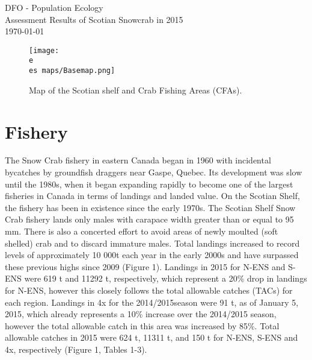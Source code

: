 \documentclass[paper=a4, fontsize=11pt]{article}
\newcommand{\e}{\string~/ecomod_data/}
\newcommand{\es}{snowcrab/}
\begin{document}
  \begin{titlepage}
  \vspace*{\fill}
  \begin{center}
    {DFO - Population Ecology}\\[0.5cm]
    {Assessment Results of Scotian Snowcrab in 2015}\\[0.4cm]
    {\normalsize\today}
\begin{figure} [h]
\centering
  \texttt{[image: \\e \\es maps/Basemap.png]}
  \caption{Map of the Scotian shelf and Crab Fishing Areas (CFAs).}
 \end{figure}
 \end{center}
\vspace*{\fill}
\end{titlepage}


\section{Fishery}
The Snow Crab fishery in eastern Canada began in 1960 with incidental bycatches by groundfish draggers near Gaspe, Quebec. Its development was slow until the 1980s, when it began expanding rapidly to become one of the largest fisheries in Canada in terms of landings and landed value. On the Scotian Shelf, the fishery has been in existence since the early 1970s. The Scotian Shelf Snow Crab fishery lands only males with carapace width greater than or equal to 95 mm. There is also a concerted effort to avoid areas of newly moulted (soft shelled) crab and to discard immature males. Total landings increased to record levels of approximately 10 000t each year in the early 2000s and have surpassed these previous highs since 2009 (Figure 1). Landings in 2015 for N-ENS and S-ENS were 619 t and 11292 t, respectively, which represent a 20\% drop in landings for N-ENS, however this closely follows the total allowable catches (TACs) for each region. Landings in 4x for the 2014/2015season were 91 t, as of January 5, 2015, which already represents a 10\% increase over the 2014/2015 season, however the total allowable catch in this area was increased by 85\%. Total allowable catches in 2015 were 624 t, 11311 t, and 150 t for N-ENS, S-ENS and 4x, respectively (Figure 1, Tables 1-3). \\
\end{document}
